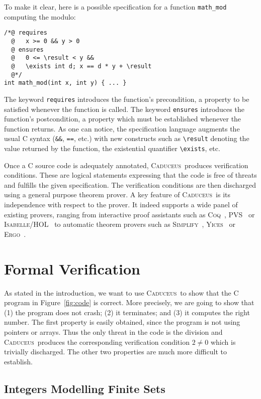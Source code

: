 \documentclass[a4paper]{llncs}
\newcommand{\caduceus}{\textsc{Caduceus}}
\newcommand{\simplify}{\textsc{Simplify}}
\newcommand{\ergo}{\textsc{Ergo}}
\newcommand{\yices}{\textsc{Yices}}
\newcommand{\coq}{\textsc{Coq}}
\begin{document}
To make it clear, here is a possible specification for a function
\texttt{math\_mod} computing the modulo:
\begin{verbatim}
/*@ requires 
  @   x >= 0 && y > 0
  @ ensures 
  @   0 <= \result < y &&
  @   \exists int d; x == d * y + \result
  @*/
int math_mod(int x, int y) { ... }
\end{verbatim}
The keyword \texttt{requires} introduces the function's precondition,
a property to be satisfied whenever the function is called.
The keyword \texttt{ensures} introduces the function's postcondition,
a property which must be established whenever the function returns.
As one can notice, the specification language augments the usual
C syntax (\verb!&&!, \verb!==!, etc.) with new constructs such as
\verb!\result! denoting the value returned by the function, the
existential quantifier \verb!\exists!, etc.

Once a C source code is adequately annotated, \caduceus\
produces verification conditions. These are logical statements
expressing that the code is free of threats and fulfills the given
specification. The verification conditions are then discharged using a
general purpose theorem prover. A key feature of \caduceus\ is
its independence with respect to the prover. It indeed supports a wide
panel of existing provers, ranging from interactive proof assistants
such as \coq~\cite{coq}, PVS~\cite{PVS} or
\textsc{Isabelle/HOL}~\cite{Isabelle} to 
automatic theorem provers such as 
\simplify~\cite{simplify}, \yices~\cite{yices} or \ergo~\cite{ergo}.


\section{Formal Verification}\label{verif}

As stated in the introduction, we want to use \caduceus\ to show that
the C program in 
Figure~\ref{fig:code} is correct. More precisely, we
are going to show that (1) the program does not crash; (2)
it terminates; and (3) it computes the right number.
The first property is easily obtained, since the program is not using
pointers or arrays. Thus the only threat in the code is the division and
\caduceus\ produces the corresponding verification condition $2\not=0$
which is trivially discharged. The other two properties are much more
difficult to establish.

\subsection{Integers Modelling Finite Sets}\label{setmodel}
\end{document}
